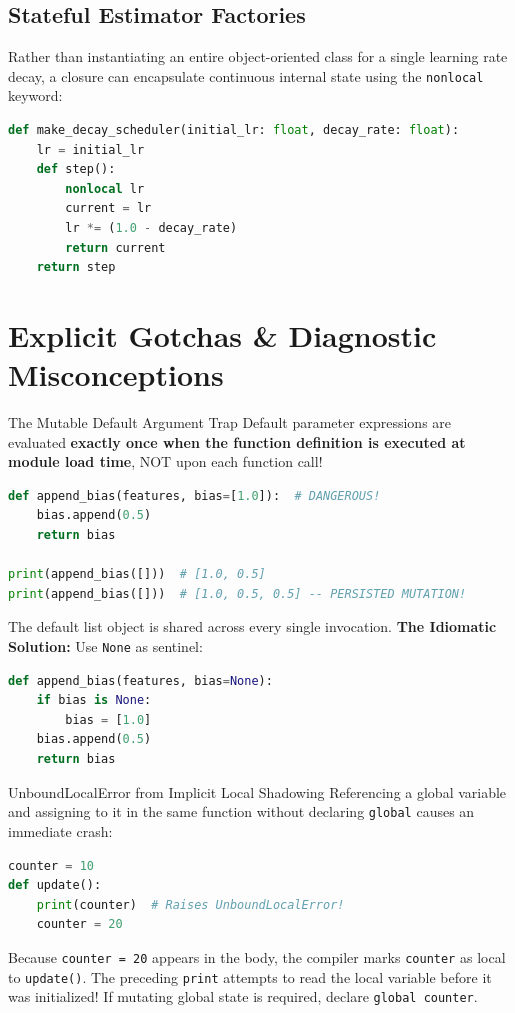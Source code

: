 \subsection{Stateful Estimator Factories}
Rather than instantiating an entire object-oriented class for a single learning rate decay, a closure can encapsulate continuous internal state using the \texttt{nonlocal} keyword:
\begin{lstlisting}[language=Python]
def make_decay_scheduler(initial_lr: float, decay_rate: float):
    lr = initial_lr
    def step():
        nonlocal lr
        current = lr
        lr *= (1.0 - decay_rate)
        return current
    return step
\end{lstlisting}

\section{Explicit Gotchas \& Diagnostic Misconceptions}

\begin{trapbox}{The Mutable Default Argument Trap}
Default parameter expressions are evaluated \textbf{exactly once when the function definition is executed at module load time}, NOT upon each function call!
\begin{lstlisting}[language=Python]
def append_bias(features, bias=[1.0]):  # DANGEROUS!
    bias.append(0.5)
    return bias

print(append_bias([]))  # [1.0, 0.5]
print(append_bias([]))  # [1.0, 0.5, 0.5] -- PERSISTED MUTATION!
\end{lstlisting}
The default list object is shared across every single invocation.
\textbf{The Idiomatic Solution:} Use \texttt{None} as sentinel:
\begin{lstlisting}[language=Python]
def append_bias(features, bias=None):
    if bias is None:
        bias = [1.0]
    bias.append(0.5)
    return bias
\end{lstlisting}
\end{trapbox}

\begin{trapbox}{UnboundLocalError from Implicit Local Shadowing}
Referencing a global variable and assigning to it in the same function without declaring \texttt{global} causes an immediate crash:
\begin{lstlisting}[language=Python]
counter = 10
def update():
    print(counter)  # Raises UnboundLocalError!
    counter = 20
\end{lstlisting}
Because \texttt{counter = 20} appears in the body, the compiler marks \texttt{counter} as local to \texttt{update()}. The preceding \texttt{print} attempts to read the local variable before it was initialized! If mutating global state is required, declare \texttt{global counter}.
\end{trapbox}

